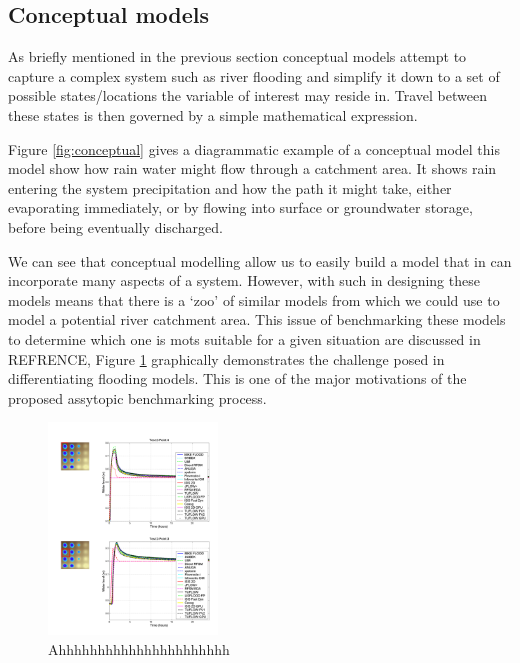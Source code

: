 \documentclass[11pt]{article}
\begin{document}
\subsection{Conceptual models}
As briefly mentioned in the previous section conceptual models attempt to capture a complex system such as river flooding and simplify it down to a set of possible states/locations the variable of interest may reside in. Travel between these states is then governed by a simple mathematical expression.



Figure \ref{fig:conceptual} gives a diagrammatic example of a conceptual model this model show how rain water might flow through a catchment area. It shows rain entering the system precipitation and how the path it might take, either evaporating immediately, or by flowing into surface or groundwater storage, before being eventually discharged.


    
We can see that conceptual modelling allow us to easily build a model that in can incorporate many aspects of a system. However, with such in designing these models means that there is a `zoo' of similar models from which we could use to model a potential river catchment area. This issue of benchmarking these models to determine which one is mots suitable for a given situation are discussed in REFRENCE, 
Figure \ref{fig:eaBench} graphically demonstrates the challenge posed in differentiating flooding models. This is one of the major motivations of the proposed assytopic benchmarking process.

\begin{figure}[H]
    \centering
    \includegraphics[width=0.4\textwidth]{Figs/EA_bench.png}
    \caption{Ahhhhhhhhhhhhhhhhhhhhhh}
    \label{fig:eaBench}
\end{figure}
\end{document}
